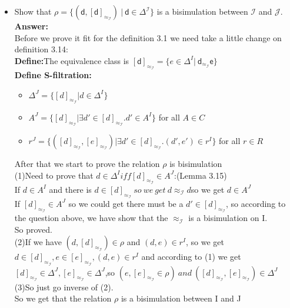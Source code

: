 \documentclass{article}
\begin{document}
    \begin{itemize}
        \item Show that $\rho=\{(\textsf{d}, [\textsf{d}]_{\approx_{\mathcal{I}}})~|~\textsf{d}\in\Delta^{\mathcal{I}}\}$ is a bisimulation between $\mathcal{I}$ and $\mathcal{J}$.
        \textbf{Answer:}\\
        Before we prove it fit for the definition 3.1 we need take a little change on definition 3.14:\\
        \textbf{Define:}The equivalence class is $[\textsf{d}]_{\approx_{\mathcal{I}}} = \{e \in \Delta^I | \ \textsf{d}_{\approx_{\mathcal{I}}} \textsf{e}\}$\\
        \textbf{Define S-filtration:}\\
        \begin{itemize}
            \item $\Delta^J = \{[d]_{\approx_{\mathcal{I}}} | d \in \Delta^I\}$\\
            \item $A^J = \{[d]_{\approx_{\mathcal{I}}} | \exists d' \in [d]_{\approx_{\mathcal{I}}}.d' \in A^I\}$ for all $A \in C$\\
            \item $r^J = \{([d]_{\approx_{\mathcal{I}}},[e]_{\approx_{\mathcal{I}}})| \exists d' \in [d]_{\approx_{\mathcal{I}}}.(d',e') \in r^I \}$ for all $r \in R$\\ 
        \end{itemize}
        After that we start to prove the relation $\rho$ is bisimulation\\
        (1)Need to prove that $d \in \Delta^I iff [d]_{\approx_{\mathcal{I}}} \in A^J$:(Lemma 3.15)\\
        If $d \in A^I$ and there is $d \in [d]_{\approx_{\mathcal{I}}} \ so\ we\ get\ d {\approx_{\mathcal{I}}} d$so we get $d \in A^J$\\
        If $[d]_{\approx_{\mathcal{I}}} \in A^J$ so we could get there must be a $d' \in [d]_{\approx_{\mathcal{I}}}$, so according to the question above, we have show that the ${\approx_{\mathcal{I}}}$ is a bisimulation on I.\\
        So proved.\\
        (2)If we have $(d,[d]_{\approx_{\mathcal{I}}}) \in \rho$ and $(d,e) \in r^I$, so we get $d \in [d]_{\approx_{\mathcal{I}}}, e \in [e]_{\approx_{\mathcal{I}}},(d,e) \in r^I$ and according to (1) we get 
        $[d]_{\approx_{\mathcal{I}}}\in \Delta^J,[e]_{\approx_{\mathcal{I}}} \in \Delta^J$,so $(e,[e]_{\approx_{\mathcal{I}}} \in \rho)\ and\ ([d]_{\approx_{\mathcal{I}}},[e]_{\approx_{\mathcal{I}}}) \in \Delta^J$\\
        (3)So just go inverse of (2).\\
        So we get that the relation $\rho$ is a bisimulation between I and J\\


\end{itemize}
\end{document}
